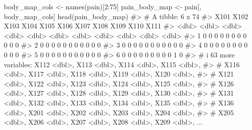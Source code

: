 \documentclass[
  letterpaper,
]{latex/krantz}
\makeatletter
\newenvironment{Shaded}{\begin{snugshade}}{\end{snugshade}}
\newcommand{\CommentTok}[1]{\textcolor[rgb]{0.37,0.37,0.37}{#1}}
\newcommand{\DecValTok}[1]{\textcolor[rgb]{0.68,0.00,0.00}{#1}}
\newcommand{\FunctionTok}[1]{\textcolor[rgb]{0.28,0.35,0.67}{#1}}
\newcommand{\NormalTok}[1]{\textcolor[rgb]{0.00,0.23,0.31}{#1}}
\newcommand{\OtherTok}[1]{\textcolor[rgb]{0.00,0.23,0.31}{#1}}
\newcommand{\SpecialCharTok}[1]{\textcolor[rgb]{0.37,0.37,0.37}{#1}}
\newenvironment{kframe}{%
\medskip{}
\setlength{\fboxsep}{.8em}
 \def\at@end@of@kframe{}%
 \ifinner\ifhmode%
  \def\at@end@of@kframe{\end{minipage}}%
  \begin{minipage}{\columnwidth}%
 \fi\fi%
 \def\FrameCommand##1{\hskip\@totalleftmargin \hskip-\fboxsep
 \colorbox{shadecolor}{##1}\hskip-\fboxsep
     \hskip-\linewidth \hskip-\@totalleftmargin \hskip\columnwidth}%
 \MakeFramed {\advance\hsize-\width
   \@totalleftmargin\z@ \linewidth\hsize
   \@setminipage}}%
 {\par\unskip\endMakeFramed%
 \at@end@of@kframe}
\renewenvironment{Shaded}{\begin{kframe}}{\end{kframe}}
\makeatother
\begin{document}
\begin{Shaded}
\begin{Highlighting}[]
\NormalTok{body\_map\_cols }\OtherTok{\textless{}{-}} \FunctionTok{names}\NormalTok{(pain)[}\DecValTok{2}\SpecialCharTok{:}\DecValTok{75}\NormalTok{]}
\NormalTok{pain\_body\_map }\OtherTok{\textless{}{-}}\NormalTok{ pain[, body\_map\_cols]}
\FunctionTok{head}\NormalTok{(pain\_body\_map)}
\CommentTok{\#\textgreater{} \# A tibble: 6 x 74}
\CommentTok{\#\textgreater{}    X101  X102  X103  X104  X105  X106  X107  X108  X109  X110  X111}
\CommentTok{\#\textgreater{}   \textless{}dbl\textgreater{} \textless{}dbl\textgreater{} \textless{}dbl\textgreater{} \textless{}dbl\textgreater{} \textless{}dbl\textgreater{} \textless{}dbl\textgreater{} \textless{}dbl\textgreater{} \textless{}dbl\textgreater{} \textless{}dbl\textgreater{} \textless{}dbl\textgreater{} \textless{}dbl\textgreater{}}
\CommentTok{\#\textgreater{} 1     0     0     0     0     0     0     0     0     0     0     0}
\CommentTok{\#\textgreater{} 2     0     0     0     0     0     0     0     0     0     0     0}
\CommentTok{\#\textgreater{} 3     0     0     0     0     0     0     0     0     0     0     0}
\CommentTok{\#\textgreater{} 4     0     0     0     0     0     0     0     0     0     0     0}
\CommentTok{\#\textgreater{} 5     0     0     0     0     0     0     0     0     0     0     0}
\CommentTok{\#\textgreater{} 6     0     0     0     0     0     0     0     0     0     1     0}
\CommentTok{\#\textgreater{} \# i 63 more variables: X112 \textless{}dbl\textgreater{}, X113 \textless{}dbl\textgreater{}, X114 \textless{}dbl\textgreater{}, X115 \textless{}dbl\textgreater{},}
\CommentTok{\#\textgreater{} \#   X116 \textless{}dbl\textgreater{}, X117 \textless{}dbl\textgreater{}, X118 \textless{}dbl\textgreater{}, X119 \textless{}dbl\textgreater{}, X120 \textless{}dbl\textgreater{},}
\CommentTok{\#\textgreater{} \#   X121 \textless{}dbl\textgreater{}, X122 \textless{}dbl\textgreater{}, X123 \textless{}dbl\textgreater{}, X124 \textless{}dbl\textgreater{}, X125 \textless{}dbl\textgreater{},}
\CommentTok{\#\textgreater{} \#   X126 \textless{}dbl\textgreater{}, X127 \textless{}dbl\textgreater{}, X128 \textless{}dbl\textgreater{}, X129 \textless{}dbl\textgreater{}, X130 \textless{}dbl\textgreater{},}
\CommentTok{\#\textgreater{} \#   X131 \textless{}dbl\textgreater{}, X132 \textless{}dbl\textgreater{}, X133 \textless{}dbl\textgreater{}, X134 \textless{}dbl\textgreater{}, X135 \textless{}dbl\textgreater{},}
\CommentTok{\#\textgreater{} \#   X136 \textless{}dbl\textgreater{}, X201 \textless{}dbl\textgreater{}, X202 \textless{}dbl\textgreater{}, X203 \textless{}dbl\textgreater{}, X204 \textless{}dbl\textgreater{},}
\CommentTok{\#\textgreater{} \#   X205 \textless{}dbl\textgreater{}, X206 \textless{}dbl\textgreater{}, X207 \textless{}dbl\textgreater{}, X208 \textless{}dbl\textgreater{}, X209 \textless{}dbl\textgreater{}, ...}
\end{Highlighting}
\end{Shaded}
\end{document}
